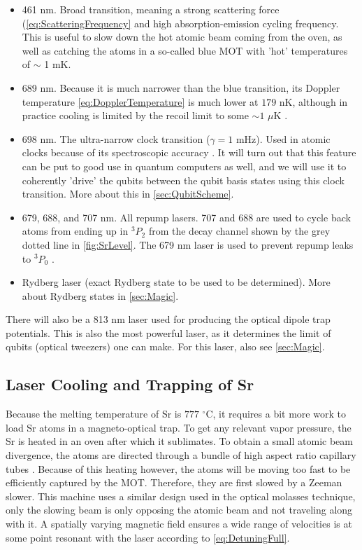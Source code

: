 \begin{itemize}
	\item 461 nm. Broad transition, meaning a strong scattering force (\cref{eq:ScatteringFrequency} and high absorption-emission cycling frequency.
	This is useful to slow down the hot atomic beam coming from the oven, as well as catching the atoms in a so-called blue \ac{MOT} with 'hot' temperatures of $\sim$ 1 mK.
	
	\item 689 nm. Because it is much narrower than the blue transition, its Doppler temperature \cref{eq:DopplerTemperature} is much lower at $179$ nK, although in practice cooling is limited by the recoil limit to some $\sim 1$ $\mu$K \cite{Stellmer2013,Boyd2007}.
	
	\item 698 nm. The ultra-narrow clock transition ($\gamma = 1$ mHz). 
	Used in atomic clocks because of its spectroscopic accuracy \cite{Bloom2014}.
	It will turn out that this feature can be put to good use in quantum computers as well, and we will use it to coherently 'drive' the qubits between the qubit basis states using this clock transition. 
	More about this in \cref{sec:QubitScheme}.
	
	\item 679, 688, and 707 nm. 
	All repump lasers. 707 and 688 are used to cycle back atoms from ending up in ${}^3P_2$ from the decay channel shown by the grey dotted line in \cref{fig:SrLevel}. The 679 nm laser is used to prevent repump leaks to ${}^3P_0$ \cite{Stellmer2013,Xu2003}.
	
	\item Rydberg laser (exact Rydberg state to be used to be determined). More about Rydberg states in \cref{sec:Magic}.
	
\end{itemize}
There will also be a 813 nm laser used for producing the optical dipole trap potentials.
This is also the most powerful laser, as it determines the limit of qubits (optical tweezers) one can make. 
For this laser, also see \cref{sec:Magic}.

\subsection{Laser Cooling and Trapping of Sr}

Because the melting temperature of Sr is $777$ ${}^{\circ}$C, it requires a bit more work to load Sr atoms in a magneto-optical trap.
To get any relevant vapor pressure, the Sr is heated in an oven after which it sublimates. 
To obtain a small atomic beam divergence, the atoms are directed through a bundle of high aspect ratio capillary tubes \cite{Stellmer2013}. Because of this heating however, the atoms will be moving too fast to be efficiently captured by the MOT.
Therefore, they are first slowed by a Zeeman slower. 
This machine uses a similar design used in the optical molasses technique, only the slowing beam is only opposing the atomic beam and not traveling along with it. 
A spatially varying magnetic field ensures a wide range of velocities is at some point resonant with the laser according to \cref{eq:DetuningFull}. 

